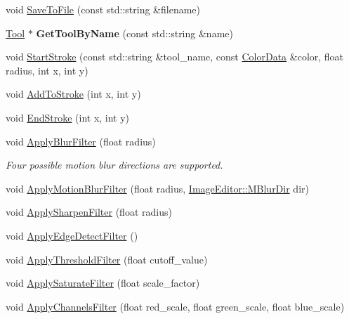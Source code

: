 \begin{DoxyCompactItemize}
\item 
void \hyperlink{classimage__tools_1_1FlashPhotoApp_a292e1e58a4848cbf055def1ad0acd79a}{Save\+To\+File} (const std\+::string \&filename)
\item 
\mbox{\label{classimage__tools_1_1FlashPhotoApp_a4e9f1d7e08fbb87ad67027c4021066c8}} 
\hyperlink{classimage__tools_1_1Tool}{Tool} $\ast$ {\bfseries Get\+Tool\+By\+Name} (const std\+::string \&name)
\item 
void \hyperlink{classimage__tools_1_1FlashPhotoApp_ab40b6ecc2ba4caa35b8e18f091b67253}{Start\+Stroke} (const std\+::string \&tool\+\_\+name, const \hyperlink{classimage__tools_1_1ColorData}{Color\+Data} \&color, float radius, int x, int y)
\item 
void \hyperlink{classimage__tools_1_1FlashPhotoApp_a1ede0fe70602cbe2d50a3123eda8a937}{Add\+To\+Stroke} (int x, int y)
\item 
void \hyperlink{classimage__tools_1_1FlashPhotoApp_a34682088e7957ea5e5adf084d2a292a8}{End\+Stroke} (int x, int y)
\item 
void \hyperlink{classimage__tools_1_1FlashPhotoApp_ab9de628d295f2ce1ea869767cb918a2d}{Apply\+Blur\+Filter} (float radius)
\begin{DoxyCompactList}\small\item\em Four possible motion blur directions are supported. \end{DoxyCompactList}\item 
void \hyperlink{classimage__tools_1_1FlashPhotoApp_aa09e633c5a2e34bf1ccf2259012011ba}{Apply\+Motion\+Blur\+Filter} (float radius, \hyperlink{classimage__tools_1_1ImageEditor_a20bacf2756f1b97eed82d2fee9628ac2}{Image\+Editor\+::\+M\+Blur\+Dir} dir)
\item 
void \hyperlink{classimage__tools_1_1FlashPhotoApp_a417e86946b777c42db91eab906d26354}{Apply\+Sharpen\+Filter} (float radius)
\item 
void \hyperlink{classimage__tools_1_1FlashPhotoApp_ae58e5cfde20b6834ac92310f2a267658}{Apply\+Edge\+Detect\+Filter} ()
\item 
void \hyperlink{classimage__tools_1_1FlashPhotoApp_aa24ef843ca6afb25886ef687d5e6c525}{Apply\+Threshold\+Filter} (float cutoff\+\_\+value)
\item 
void \hyperlink{classimage__tools_1_1FlashPhotoApp_ae9be418a3b05fe8bf16dacc95708fb28}{Apply\+Saturate\+Filter} (float scale\+\_\+factor)
\item 
void \hyperlink{classimage__tools_1_1FlashPhotoApp_a4560186e719150bcecc0b665a48bb1d2}{Apply\+Channels\+Filter} (float red\+\_\+scale, float green\+\_\+scale, float blue\+\_\+scale)

\end{DoxyCompactItemize}
